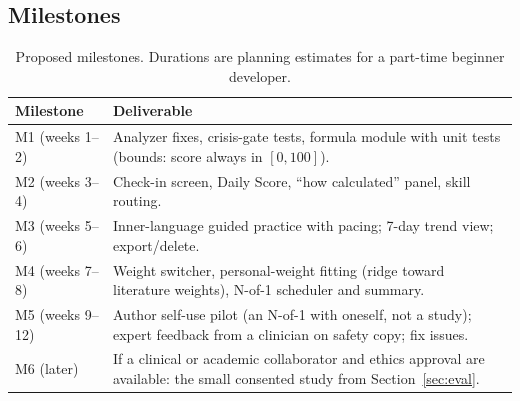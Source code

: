 \documentclass[11pt]{article}
\begin{document}
\subsection{Milestones}
\begin{table}[h]
\centering\small
\begin{tabular}{@{}l p{11.8cm}@{}}
\toprule
Milestone & Deliverable\\
\midrule
M1 (weeks 1--2) & Analyzer fixes, crisis-gate tests, formula module with unit tests (bounds: score always in $[0,100]$).\\
M2 (weeks 3--4) & Check-in screen, Daily Score, ``how calculated'' panel, skill routing.\\
M3 (weeks 5--6) & Inner-language guided practice with pacing; 7-day trend view; export/delete.\\
M4 (weeks 7--8) & Weight switcher, personal-weight fitting (ridge toward literature weights), N-of-1 scheduler and summary.\\
M5 (weeks 9--12) & Author self-use pilot (an N-of-1 with oneself, not a study); expert feedback from a clinician on safety copy; fix issues.\\
M6 (later) & If a clinical or academic collaborator and ethics approval are available: the small consented study from Section~\ref{sec:eval}.\\
\bottomrule
\end{tabular}
\caption{Proposed milestones. Durations are planning estimates for a part-time beginner developer.}
\end{table}
\end{document}
